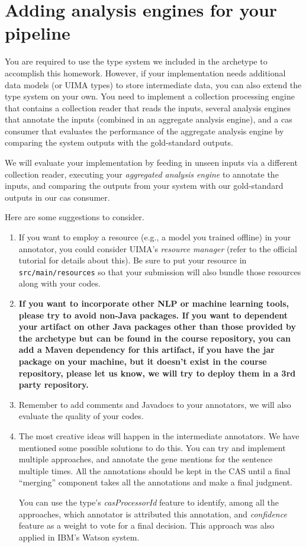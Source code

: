
\section{Adding analysis engines for your pipeline}

You are required to use the type system we included in the archetype to
accomplish this homework. However, if your implementation needs additional data
models (or UIMA types) to store intermediate data, you can also extend the type
system on your own. You need to implement a collection processing engine that
contains a collection reader that reads the inputs, several analysis engines
that annotate the inputs (combined in an aggregate analysis engine), and a cas
consumer that evaluates the performance of the aggregate analysis engine by
comparing the system outputs with the gold-standard outputs.

We will evaluate your implementation by feeding in unseen inputs via a different
collection reader, executing your \emph{aggregated analysis engine} to annotate
the inputs, and comparing the outputs from your system with our gold-standard
outputs in our cas consumer.

Here are some suggestions to consider.

\begin{enumerate}

\item If you want to employ a resource (e.g., a model you trained offline) in
your annotator, you could consider UIMA's \emph{resource manager} (refer to the
official tutorial for details about this).
Be sure to put your resource in \texttt{src/main/resources} so that your
submission will also bundle those resources along with your codes.

\item \textbf{If you want to incorporate other NLP or machine learning tools,
please try to avoid non-Java packages. If you want to dependent your artifact on
other Java packages other than those provided by the archetype but can be found
in the course repository, you can add a Maven dependency for this artifact, if
you have the jar package on your machine, but it doesn't exist in the course
repository, please let us know, we will try to deploy them in a 3rd party
repository.}

\item Remember to add comments and Javadocs to your annotators, we will also
evaluate the quality of your codes.

\item The most creative ideas will happen in the intermediate annotators. We
have mentioned some possible solutions to do this. You can try and implement
multiple approaches, and annotate the gene mentions for the sentence multiple
times. All the annotations should be kept in the CAS until a final ``merging''
component takes all the annotations and make a final judgment.

You can use the type's \emph{casProcessorId} feature to identify, among all the
approaches, which annotator is attributed this annotation, and \emph{confidence}
feature as a weight to vote for a final decision. This approach was also applied
in IBM's Watson system.

\end{enumerate}
